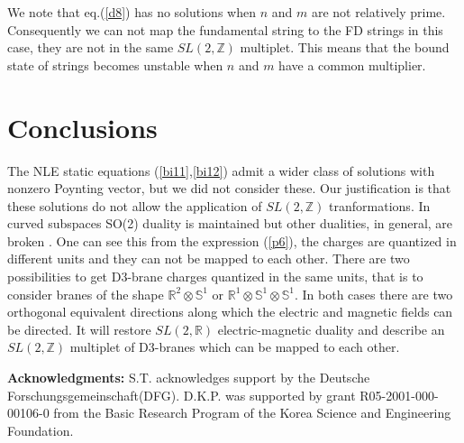 \documentclass[a4paper,12pt]{article}
\begin{document}
\noindent

We note that eq.(\ref{d8}) has no solutions when $n$ and $m$ are not 
relatively prime. Consequently we can not map the fundamental string to the 
FD strings in this case, they are not in the same $SL(2,\mathbb{Z})$ 
multiplet. This means that the bound state of strings becomes unstable when 
$n$ and $m$ have a common multiplier.   

\section{Conclusions}

\noindent

The NLE static equations (\ref{bi11},\ref{bi12}) admit a wider class of 
solutions 
with nonzero Poynting vector, but we did not consider these. Our justification 
is that these solutions do not allow the application of $SL(2,\mathbb{Z})$ 
tranformations. In curved subspaces SO(2) duality is maintained but other 
dualities, 
in general, are broken \cite{4}. One can see this from the expression 
(\ref{p6}), the charges are quantized in different units and they can not
be mapped to each other. There are two possibilities to get D3-brane charges 
quantized in the same units, that is to consider branes of the shape 
$\mathbb{R}^2\otimes\mathbb{S}^1$ or
$\mathbb{R}^1\otimes\mathbb{S}^1\otimes\mathbb{S}^1$. In both cases there are 
two orthogonal equivalent directions along which the electric and magnetic 
fields can be directed. It will restore $SL(2,\mathbb{R})$ electric-magnetic 
duality and describe an $SL(2,\mathbb{Z})$ multiplet of D3-branes which can be 
mapped to each other.

\smallskip

{\bf Acknowledgments:}
\newline
S.T. acknowledges support by the Deutsche Forschungsgemeinschaft(DFG).
D.K.P. was supported by grant R05-2001-000-00106-0 from the Basic Research 
Program of the Korea Science and Engineering Foundation.
\end{document}
